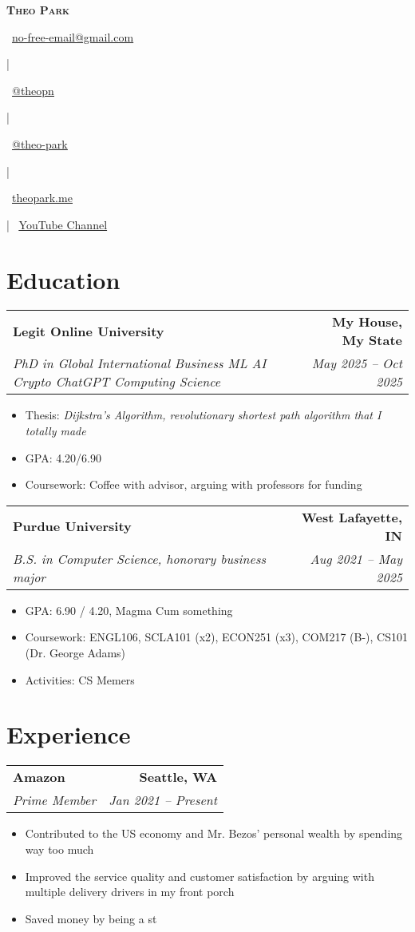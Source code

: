 \documentclass[letterpaper,11pt]{article} %
\makeatletter
\newcommand{\bigname}[1]{
  \textbf{\Huge \scshape #1} \\ \vspace*{0.5em}
}
\newcommand{\email}[1]{
  \raisebox{-0.2\height}\faEnvelope\
  \href{mailto:#1}{\underline{#1}} \nobreakspace{}
}
\newcommand{\website}[1]{
  \raisebox{-0.2\height}\faLink\
  \href{https://#1}{\underline{#1}} ~
}
\newcommand{\github}[1]{
  \raisebox{-0.2\height}\faGithub\
  \href{https://github.com/#1}{\underline{@#1}} ~
}
\newcommand{\linkedin}[1]{
  \raisebox{-0.2\height}\faLinkedinSquare\
  \href{https://linkedin.com/in/#1}{\underline{@#1}} ~
}
\newcommand{\fourItems}[4]{
  \begin{tabular*}{1.0\textwidth}[t]{l@{\extracolsep{\fill}}r}
    \textbf{\large #1} & \textbf{\small #2} \\
    \textit{\large #3} & \textit{\small #4} \\
  \end{tabular*}

  \vspace*{-0.5em}
}
\newenvironment{tightItemize}
  {\begin{itemize}[itemsep=-0.3em]}
  {\end{itemize}\vspace*{-0.5em}}
\makeatother
\begin{document}
\thispagestyle{empty} %


  \bigname{Theo Park}
  \email{no-free-email@gmail.com}
  |
  \github{theopn}
  |
  \linkedin{theo-park}
  |
  \website{theopark.me}
  |
  \raisebox{-0.2\height}\faYoutube\
  \href{https://youtu.be/dQw4w9WgXcQ}{\underline{YouTube Channel}} ~


\section{Education}

\fourItems{Legit Online University}{My House, My State}
          {PhD in Global International Business ML AI Crypto ChatGPT Computing Science}{May 2025 -- Oct 2025}
\begin{tightItemize}
  \item Thesis: \textit{Dijkstra's Algorithm, revolutionary shortest path algorithm that I totally made}
  \item GPA: 4.20/6.90
  \item Coursework: Coffee with advisor, arguing with professors for funding
\end{tightItemize}

\fourItems{Purdue University}{West Lafayette, IN}
          {B.S. in Computer Science, honorary business major}{Aug 2021 -- May 2025}
\begin{tightItemize}
  \item GPA: 6.90 / 4.20, Magma Cum something
  \item Coursework: ENGL106, SCLA101 (x2), ECON251 (x3), COM217 (B-), CS101 (Dr. George Adams)
  \item Activities: CS Memers
\end{tightItemize}


\section{Experience}

\fourItems{Amazon}{Seattle, WA}
{Prime Member}{Jan 2021 -- Present}
\begin{tightItemize}
  \item Contributed to the US economy and Mr. Bezos' personal wealth by spending way too much
  \item Improved the service quality and customer satisfaction by arguing with multiple delivery drivers in my front porch
  \item Saved money by being a st
\end{tightItemize}
\end{document}
